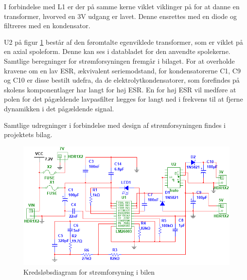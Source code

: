 I forbindelse med L1 er der på samme kerne viklet viklinger på for at danne en transformer, hvorved en 3V udgang er lavet. 
Denne ensrettes med en diode og filtreres med en kondensator. 

U2 på figur \ref{fig:bil_psu} består af den føromtalte egenviklede transformer, som er viklet på en axial spoleform. 
Denne kan ses i databladet for den anvendte spolekerne\cite{lib:psu_L1core}. 
Samtlige beregninger for strømforsyningen fremgår i bilaget\cite{lib:psu_calcs}.
For at overholde kravene om en lav ESR, ækvivalent seriemodstand, for kondensatorerne C1, C9 og C10 er disse bestilt udefra, da de elektrolytkondensatorer, som forefindes på skolens komponentlager har langt for høj ESR. 
En for høj ESR vil medføre at polen for det pågældende lavpasfilter lægges for langt ned i frekvens til at fjerne dynamikken i det pågældende signal.

Samtlige udregninger i forbindelse med design af strømforsyningen findes i projektets bilag\cite{lib:psu_calcs}.

\begin{landscape}
\begin{figure}[h]
\centering
\includegraphics[height=\textwidth-3.5 cm]{../fig/diagrammer/bil/psu_kredsloeb}
\caption{Kredsløbsdiagram for strømforsyning i bilen}
\label{fig:bil_psu}
\end{figure}
\end{landscape}